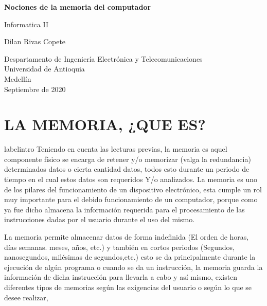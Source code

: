 \documentclass{article}
\begin{document}
\begin{titlepage}
    \begin{center}
        \vspace*{1cm}
            
        \Huge
        \textbf{Nociones de la memoria del computador }
            
        \vspace{0.5cm}
        \LARGE
       Informatica II
            
        \vspace{1.5cm}
            
        {Dilan Rivas Copete}
       
        
            
        \vfill
            
        \vspace{0.8cm}
            
        \Large
        Despartamento de Ingeniería Electrónica y Telecomunicaciones\\
        Universidad de Antioquia\\
        Medellín\\
        Septiembre de 2020
            
    \end{center}
\end{titlepage}

\tableofcontents
\newpage
\section{LA MEMORIA, ¿QUE ES?}label{intro}
Teniendo en cuenta las lecturas previas,  la memoria es aquel componente físico  se encarga de retener y/o memorizar (valga la redundancia) determinados datos o cierta cantidad datos, todos esto durante un periodo de tiempo en el cual estos datos son requeridos Y/o analizados. ​La memoria es uno de los  pilares del funcionamiento de un dispositivo electrónico, esta  cumple un rol muy importante para el debido funcionamiento  de un computador, porque como ya fue dicho almacena la información requerida para el procesamiento de las instrucciones dadas por el usuario durante el uso del mismo.

La memoria permite almacenar datos de forma indefinida (El orden de horas, días semanas. meses, años, etc.) y también en cortos periodos (Segundos, nanosegundos, milésimas de segundos,etc.) esto se da principalmente durante la ejecución de algún programa o cuando se da un instrucción, la memoria guarda la información de dicha instrucción para llevarla a cabo y así mismo, existen diferentes tipos de memorias según las exigencias del usuario o según lo que se desee realizar,
\end{document}
